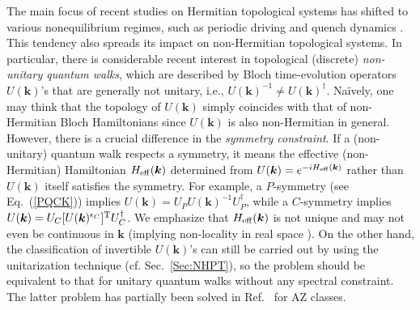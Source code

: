 \documentclass{tADP2e}
\theoremstyle{plain}
\theoremstyle{plain}
\theoremstyle{definition}
\begin{document}
\vspace{3pt}
\noindent
The main focus of recent studies on Hermitian topological systems has   
shifted to various nonequilibrium regimes, such as periodic driving \cite{OT09,KT10b,KT10,JL11} and quench dynamics \cite{CMD15,BJC16,WC17,LL18,GZ18,McM18,LZ18}. This tendency also spreads its impact on non-Hermitian topological systems. In particular, there is considerable recent interest in topological (discrete) \emph{non-unitary quantum walks}, which are described by Bloch time-evolution operators $U(\boldsymbol{k})$'s that are generally not unitary, i.e., $U(\boldsymbol{k})^{-1}\neq U(\boldsymbol{k})^\dag$. Na\"ively, one may think that the topology of $U(\boldsymbol{k})$ simply coincides with that of non-Hermitian Bloch Hamiltonians since $U(\boldsymbol{k})$ is also non-Hermitian in general. However, there is a crucial difference in the \emph{symmetry constraint}. If a (non-unitary) quantum walk respects a symmetry, it means the effective (non-Hermitian) Hamiltonian $H_{\rm eff}(\boldsymbol{k})$ determined from $U(\boldsymbol{k})=e^{-iH_{\rm eff}(\boldsymbol{k})}$ rather than $U(\boldsymbol{k})$ itself satisfies the symmetry. For example, a $P$-symmetry (see Eq.~(\ref{PQCK})) implies $U(\boldsymbol{k})=U_PU(\boldsymbol{k})^{-1}U_P^\dag$, while a $C$-symmetry implies $U(\boldsymbol{k})=U_C[U(\boldsymbol{k})^{\epsilon_C}]^{\rm T}U_C^\dag$. We emphasize that $H_{\rm eff}(\boldsymbol{k})$ is not unique and may not even be continuous in $\boldsymbol{k}$ (implying non-locality in real space \cite{GD12}). On the other hand, the classification of invertible $U(\boldsymbol{k})$'s can still be carried out by using the unitarization technique (cf. Sec.~\ref{Sec:NHPT}), so the problem should be equivalent to that for unitary quantum walks without any spectral constraint. The latter problem has partially been solved in Ref.~\cite{HS19} for AZ classes.
\end{document}
